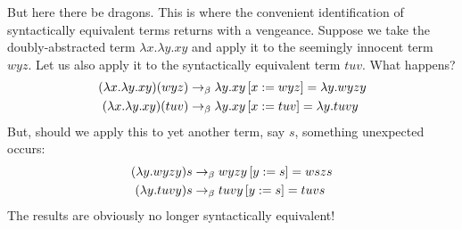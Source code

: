 But here there be dragons. This is where the convenient identification of syntactically equivalent terms returns with a vengeance. Suppose we take the doubly-abstracted term $\lambda x. \lambda y. x y$ and apply it to the seemingly innocent term $w y z$. Let us also apply it to the syntactically equivalent term $t u v$. What happens?
\begin{align*}
(\lambda x. \lambda y. x y) (w y z) &\betared \replace{x}{w y z}{\lambda y. xy} = \lambda y. w y z y
\\
(\lambda x. \lambda y. x y) (t u v) &\betared \replace{x}{t u v}{\lambda y. xy} = \lambda y. t u v y
\end{align*}
But, should we apply this to yet another term, say $s$, something unexpected occurs:
\begin{align*}
(\lambda y. w y z y) s &\betared \replace{y}{s}{w y z y} = w s z s
\\
(\lambda y. t u v y) s &\betared \replace{y}{s}{t u v y} = t u v s
\end{align*}
The results are obviously no longer syntactically equivalent!

